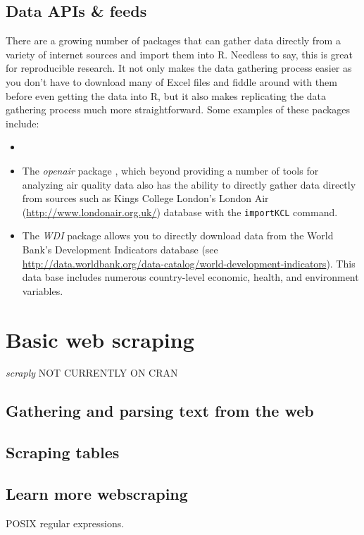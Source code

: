 \subsection{Data APIs \& feeds}


There are a growing number of packages that can gather data directly from a variety of internet sources and import them into R. Needless to say, this is great for reproducible research. It not only makes the data gathering process easier as you don't have to download many of Excel files and fiddle around with them before even getting the data into R, but it also makes replicating the data gathering process much more straightforward. Some examples of these packages include: 

\begin{itemize}
	\item {}
	\item The \emph{openair} package \cite{R-openair}, which beyond providing a number of tools for analyzing air quality data also has the ability to directly gather data directly from sources such as Kings College London's London Air (\url{http://www.londonair.org.uk/}) database with the \texttt{importKCL} command.
	\item The \emph{WDI} package \cite{R-WDI} allows you to directly download data from the World Bank's Development Indicators database (see \url{http://data.worldbank.org/data-catalog/world-development-indicators}). This data base includes numerous country-level economic, health, and environment variables. 
\end{itemize}

\section{Basic web scraping}

\emph{scraply}  NOT CURRENTLY ON CRAN



\subsection{Gathering and parsing text from the web}

\subsection{Scraping tables}

\subsection{Learn more webscraping}

POSIX regular expressions.

